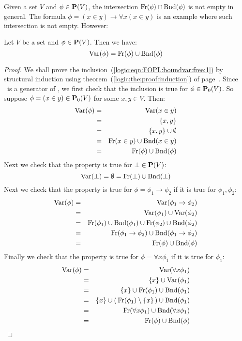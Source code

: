 Given a set $V$ and $\phi\in\mbox{${\bf P}(V)$}$, the intersection
$\mbox{\rm Fr}(\phi)\cap\mbox{\rm Bnd}(\phi)$ is not empty in general. The formula
$\phi=(x\in y)\to\forall x(x\in y)$ is an example where such
intersection is not empty. However:

\begin{prop}\label{logic:prop:FOPL:boundvar:free}
Let $V$ be a set and $\phi\in\mbox{${\bf P}(V)$}$. Then we have:
    \begin{equation}\label{logic:eqn:FOPL:boundvar:free:1}
    \mbox{\rm Var}(\phi)=\mbox{\rm Fr}(\phi)\cup\mbox{\rm Bnd}(\phi)
    \end{equation}
\end{prop}
\begin{proof}
We shall prove the inclusion~(\ref{logic:eqn:FOPL:boundvar:free:1})
by structural induction using
theorem~(\ref{logic:the:proof:induction}) of
page~\pageref{logic:the:proof:induction}. Since \pvo\ is a generator
of \pv, we first check that the inclusion is true for $\phi\in\mbox{${\bf P}_{0}(V)$}$.
So suppose $\phi=(x\in y)\in\mbox{${\bf P}_{0}(V)$}$ for some $x,y\in V$. Then:
    \begin{eqnarray*}
    \mbox{\rm Var}(\phi)&=&\mbox{\rm Var}(x\in y)\\
    &=&\{x,y\}\\
    &=&\{x,y\}\cup\emptyset\\
    &=&\mbox{\rm Fr}(x\in y)\cup\mbox{\rm Bnd}(x\in y)\\
    &=&\mbox{\rm Fr}(\phi)\cup\mbox{\rm Bnd}(\phi)
    \end{eqnarray*}
Next we check that the property is true for $\bot\in\mbox{${\bf P}(V)$}$:
    \[
    \mbox{\rm Var}(\bot)=\emptyset=\mbox{\rm Fr}(\bot)\cup\mbox{\rm Bnd}(\bot)
    \]
Next we check that the property is true for
$\phi=\phi_{1}\to\phi_{2}$ if it is true for $\phi_{1},\phi_{2}$:
    \begin{eqnarray*}
    \mbox{\rm Var}(\phi)&=&\mbox{\rm Var}(\phi_{1}\to\phi_{2})\\
    &=&\mbox{\rm Var}(\phi_{1})\cup\mbox{\rm Var}(\phi_{2})\\
    &=&\mbox{\rm Fr}(\phi_{1})\cup\mbox{\rm Bnd}(\phi_{1})\cup\mbox{\rm Fr}(\phi_{2})\cup\mbox{\rm Bnd}(\phi_{2})\\
    &=&\mbox{\rm Fr}(\phi_{1}\to\phi_{2})\cup\mbox{\rm Bnd}(\phi_{1}\to\phi_{2})\\
    &=&\mbox{\rm Fr}(\phi)\cup\mbox{\rm Bnd}(\phi)
    \end{eqnarray*}
Finally we check that the property is true for $\phi=\forall
x\phi_{1}$ if it is true for $\phi_{1}$:
    \begin{eqnarray*}
    \mbox{\rm Var}(\phi)&=&\mbox{\rm Var}(\forall x\phi_{1})\\
    &=&\{x\}\cup\mbox{\rm Var}(\phi_{1})\\
    &=&\{x\}\cup\mbox{\rm Fr}(\phi_{1})\cup\mbox{\rm Bnd}(\phi_{1})\\
    &=&\{x\}\cup(\,\mbox{\rm Fr}(\phi_{1})\setminus\{x\}\,)\cup\mbox{\rm Bnd}(\phi_{1})\\
    &=&\mbox{\rm Fr}(\forall x\phi_{1})\cup\mbox{\rm Bnd}(\forall x\phi_{1})\\
    &=&\mbox{\rm Fr}(\phi)\cup\mbox{\rm Bnd}(\phi)
    \end{eqnarray*}
\end{proof}


